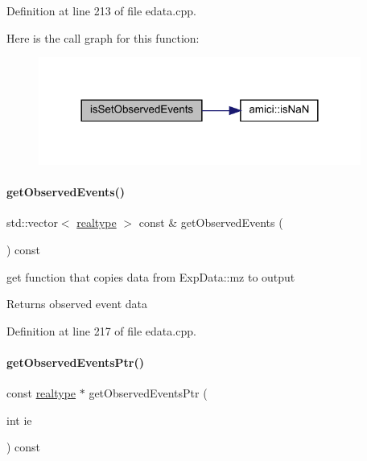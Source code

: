 Definition at line 213 of file edata.\+cpp.

Here is the call graph for this function\+:
\nopagebreak
\begin{figure}[H]
\begin{center}
\leavevmode
\includegraphics[width=300pt]{classamici_1_1_exp_data_a7270ea1362212e4dc344e24dc01b70ee_cgraph}
\end{center}
\end{figure}
\mbox{\label{classamici_1_1_exp_data_a4f70119553de7d120b14600d7a6d5267}} 
\paragraph{\texorpdfstring{get\+Observed\+Events()}{getObservedEvents()}}
{\footnotesize\ttfamily std\+::vector$<$ \mbox{\hyperlink{namespaceamici_a1bdce28051d6a53868f7ccbf5f2c14a3}{realtype}} $>$ const  \& get\+Observed\+Events (\begin{DoxyParamCaption}{ }\end{DoxyParamCaption}) const}

get function that copies data from Exp\+Data\+::mz to output

\begin{DoxyReturn}{Returns}
observed event data 
\end{DoxyReturn}


Definition at line 217 of file edata.\+cpp.

\mbox{\label{classamici_1_1_exp_data_a95ab3fe91af62612f202fdc6cd033d2a}} 
\paragraph{\texorpdfstring{get\+Observed\+Events\+Ptr()}{getObservedEventsPtr()}}
{\footnotesize\ttfamily const \mbox{\hyperlink{namespaceamici_a1bdce28051d6a53868f7ccbf5f2c14a3}{realtype}} $\ast$ get\+Observed\+Events\+Ptr (\begin{DoxyParamCaption}\item[{int}]{ie }\end{DoxyParamCaption}) const}

